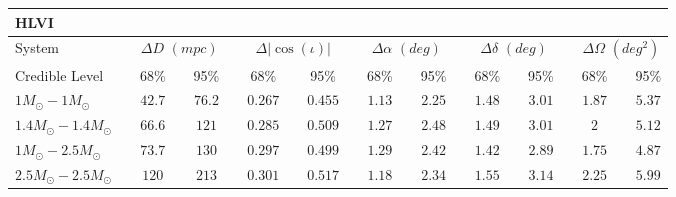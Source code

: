 \documentclass[11pt,a4paper]{emulateapj} 
\begin{document}
\begin{table}[t!]
{\begin{tabular}{lcccccccccccccccccccc}
\\HLVI\\ 
\hline\hline System & \vline & \multicolumn{3}{c}{$\Delta D$ $(mpc)$} & \vline &
\multicolumn{3}{c}{$\Delta |\cos(\iota)|$} & \vline & \multicolumn{3}{c}{$\Delta \alpha$ $(deg)$} & \vline &
\multicolumn{3}{c}{$\Delta \delta$ $(deg)$} & \vline & \multicolumn{3}{c}{$\Delta\Omega$
$(deg^2)$}\\\hline
Credible Level & \vline & 68\% & \vline & 95\% & \vline & 68\% & \vline & 95\% & \vline & 68\% & \vline & 95\% & \vline & 68\% & \vline & 95\% & \vline & 68\% & \vline & 95\% \\
 \hline\hline 
$1M_{\odot}-1M_{\odot}$ & \vline &$42.7$ & \vline &$76.2$ & \vline & $0.267$ & \vline &$0.455$ & \vline & $1.13$ & \vline &$2.25$ & \vline & $1.48$ & \vline &$3.01$ & \vline & $1.87$ & \vline &$5.37$\\\hline$1.4M_{\odot}-1.4M_{\odot}$ & \vline &$66.6$ & \vline &$121$ & \vline & $0.285$ & \vline &$0.509$ & \vline & $1.27$ & \vline &$2.48$ & \vline & $1.49$ & \vline &$3.01$ & \vline & $2$ & \vline &$5.12$\\\hline$1M_{\odot}-2.5M_{\odot}$ & \vline &$73.7$ & \vline &$130$ & \vline & $0.297$ & \vline &$0.499$ & \vline & $1.29$ & \vline &$2.42$ & \vline & $1.42$ & \vline &$2.89$ & \vline & $1.75$ & \vline &$4.87$\\\hline$2.5M_{\odot}-2.5M_{\odot}$ & \vline &$120$ & \vline &$213$ & \vline & $0.301$ & \vline &$0.517$ & \vline & $1.18$ & \vline &$2.34$ & \vline & $1.55$ & \vline &$3.14$ & \vline & $2.25$ & \vline &$5.99$\\ \hline

\end{tabular}}
\label{ciTableExtrinsic}
\end{table}
\end{document}
